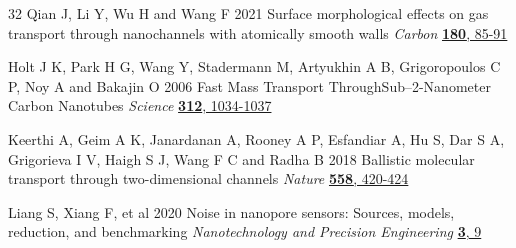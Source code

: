 \documentclass[%
 reprint,
 aps,
 prb,
 epsf,
]{revtex4-2}
\begin{document}
\begin{thebibliography}{32}
 Qian J, Li Y, Wu H and Wang F 2021 Surface morphological effects on gas transport through nanochannels with atomically smooth walls \textit{Carbon } \href{https://doi.org/10.1016/j.carbon.2021.04.087}{\textbf{180}, 85-91}

 Holt J K, Park H G, Wang Y, Stadermann M, Artyukhin A B, Grigoropoulos C P, Noy A and Bakajin O 2006 Fast Mass Transport ThroughSub–2-Nanometer Carbon Nanotubes \textit{Science } \href{https://doi.org/10.1126/science.1126298} {\textbf{312}, 1034-1037}

 Keerthi A, Geim A K, Janardanan A, Rooney A P, Esfandiar A, Hu S, Dar S A, Grigorieva I V, Haigh S J, Wang F C and Radha B 2018 Ballistic molecular transport through two-dimensional channels \textit{Nature }  \href {https://doi.org/10.1038/s41586-018-0203-2} {\textbf{558}, 420-424}

 Liang S, Xiang F, et al 2020 Noise in nanopore sensors: Sources, models, reduction, and benchmarking \textit{Nanotechnology and Precision Engineering }\href{https://doi.org/10.1016/j.npe.2019.12.008} {\textbf{3}, 9}

\end{thebibliography}%
\end{document}
